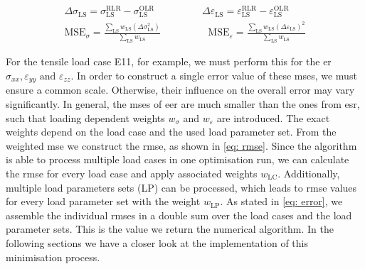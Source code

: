 \begin{gather}
    \label{eq: EMDifference}
    \Delta\sigma_{\scriptscriptstyle\text{LS}} = \sigma_{\scriptscriptstyle\text{LS}}^{\scriptscriptstyle\text{RLR}} - \sigma_{\scriptscriptstyle\text{LS}}^{\scriptscriptstyle\text{OLR}} \hspace{2cm}
    \Delta\varepsilon_{\scriptscriptstyle\text{LS}} = \varepsilon_{\scriptscriptstyle\text{LS}}^{\scriptscriptstyle\text{RLR}} - \varepsilon_{\scriptscriptstyle\text{LS}}^{\scriptscriptstyle\text{OLR}}\\
    \label{eq: mse}
    \text{MSE}_{\sigma} = \frac{\displaystyle\sum_{\text{LS}} w_{\scriptscriptstyle\text{LS}} (\Delta\sigma_{\scriptscriptstyle\text{LS}}^2)}{\displaystyle\sum_{\text{LS}}w_{\scriptscriptstyle\text{LS}} } \hspace{2cm}
    \text{MSE}_{\varepsilon} = \frac{\displaystyle\sum_{\text{LS}} w_{\scriptscriptstyle\text{LS}} (\Delta\varepsilon_{\scriptscriptstyle\text{LS}})^2}{\displaystyle\sum_{\text{LS}}w_{\scriptscriptstyle\text{LS}}}
\end{gather}

For the tensile load case E11, for example, we must perform this for the \acrlong{er} $\sigma_{xx}, \varepsilon_{yy} \text{ and } \varepsilon_{zz}$. 
In order to construct a single error value of these \acrshort{mse}s, we must ensure a common scale. Otherwise, their influence on the overall error may vary significantly.
In general, the \acrshort{mse}s of \acrlong{eer} are much smaller than the ones from \acrlong{esr}, such that loading dependent weights $w_{\sigma}$ and $w_{\varepsilon}$ are introduced. 
The exact weights depend on the load case and the used load parameter set.
From the weighted \acrshort{mse} we construct the \acrshort{rmse}, as shown in \autoref{eq: rmse}. 
Since the algorithm is able to process multiple load cases in one optimisation run, we can calculate the \acrshort{rmse} for every load case and apply associated weights $w_{\scriptscriptstyle\text{LC}}$. Additionally, multiple load parameters sets (LP) can be processed, which leads to \acrshort{rmse} values for every load parameter set with the weight $w_{\scriptscriptstyle\text{LP}}$. 
As stated in \autoref{eq: error}, we assemble the individual \acrshort{rmse}s in a double sum over the load cases and the load parameter sets. This  is the value we return the numerical algorithm. In the following sections we have a closer look at the implementation of this minimisation process. 

